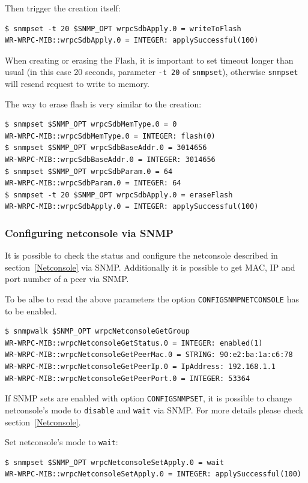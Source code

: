 \documentclass[a4paper, 12pt]{article}
\renewcommand{\_}{\underscore\allowbreak}
\begin{document}
Then trigger the creation itself:
\begin{lstlisting}
$ snmpset -t 20 $SNMP_OPT wrpcSdbApply.0 = writeToFlash
WR-WRPC-MIB::wrpcSdbApply.0 = INTEGER: applySuccessful(100)
\end{lstlisting}
When creating or erasing the Flash, it is important to set timeout longer than
usual (in this case 20 seconds, parameter \texttt{-t 20} of \texttt{snmpset}),
otherwise \texttt{snmpset} will resend request to write to memory.

The way to erase flash is very similar to the creation:
\begin{lstlisting}
$ snmpset $SNMP_OPT wrpcSdbMemType.0 = 0
WR-WRPC-MIB::wrpcSdbMemType.0 = INTEGER: flash(0)
$ snmpset $SNMP_OPT wrpcSdbBaseAddr.0 = 3014656
WR-WRPC-MIB::wrpcSdbBaseAddr.0 = INTEGER: 3014656
$ snmpset $SNMP_OPT wrpcSdbParam.0 = 64
WR-WRPC-MIB::wrpcSdbParam.0 = INTEGER: 64
$ snmpset -t 20 $SNMP_OPT wrpcSdbApply.0 = eraseFlash
WR-WRPC-MIB::wrpcSdbApply.0 = INTEGER: applySuccessful(100)
\end{lstlisting}

\subsubsection{Configuring netconsole via SNMP}
\label{Configuring netconsole via SNMP}

It is possible to check the status and configure the netconsole described in
section~\ref{Netconsole} via SNMP. Additionally it is possible to get MAC, IP
and port number of a peer via SNMP.

To be albe to read the above parameters the option
\texttt{CONFIG\_SNMP\_NETCONSOLE} has to be enabled.
\begin{lstlisting}
$ snmpwalk $SNMP_OPT wrpcNetconsoleGetGroup
WR-WRPC-MIB::wrpcNetconsoleGetStatus.0 = INTEGER: enabled(1)
WR-WRPC-MIB::wrpcNetconsoleGetPeerMac.0 = STRING: 90:e2:ba:1a:c6:78
WR-WRPC-MIB::wrpcNetconsoleGetPeerIp.0 = IpAddress: 192.168.1.1
WR-WRPC-MIB::wrpcNetconsoleGetPeerPort.0 = INTEGER: 53364
\end{lstlisting}

If SNMP sets are enabled with option \texttt{CONFIG\_SNMP\_SET}, it is possible
to change netconsole's mode to \texttt{disable} and \texttt{wait} via SNMP.
For more details please check section~\ref{Netconsole}.

Set netconsole's mode to \texttt{wait}:
\begin{lstlisting}
$ snmpset $SNMP_OPT wrpcNetconsoleSetApply.0 = wait
WR-WRPC-MIB::wrpcNetconsoleSetApply.0 = INTEGER: applySuccessful(100)
\end{lstlisting}
\end{document}
